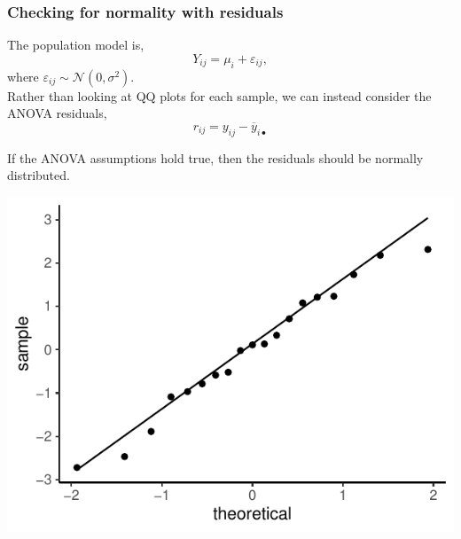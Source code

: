 \documentclass[a4paper]{article}\usepackage[]{graphicx}\usepackage[]{xcolor}
\makeatletter
\def\maxwidth{ %
  \ifdim\Gin@nat@width>\linewidth
    \linewidth
  \else
    \Gin@nat@width
  \fi
}
\makeatother
\begin{document}
\subsubsection{Checking for normality with residuals}
The population model is,
\[
	Y_{ij} = \mu_i + \varepsilon_{ij},
\]
where \( \varepsilon_{ij} \sim \mathcal{N} (0,\sigma^2) \).\\
Rather than looking at QQ plots for each sample, we can instead consider the ANOVA residuals,
\[
	r_{ij} = y_{ij} - \overline{y}_{i\bullet}
\]
\begin{goldbox}
	If the ANOVA assumptions hold true, then the residuals should be normally distributed.
\end{goldbox}
\begin{Schunk}


{\centering \includegraphics[width=\maxwidth]{figure/listings-unnamed-chunk-239-1} 

}

\end{Schunk}
\end{document}
